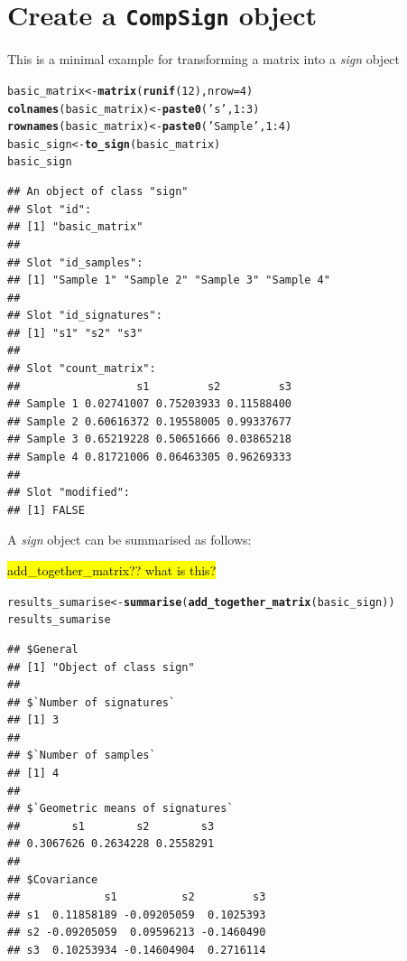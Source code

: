 \documentclass{article}\usepackage[]{graphicx}\usepackage[]{color}
\makeatletter
\newcommand{\hlnum}[1]{\textcolor[rgb]{0.686,0.059,0.569}{#1}}%
\newcommand{\hlstr}[1]{\textcolor[rgb]{0.192,0.494,0.8}{#1}}%
\newcommand{\hlopt}[1]{\textcolor[rgb]{0,0,0}{#1}}%
\newcommand{\hlstd}[1]{\textcolor[rgb]{0.345,0.345,0.345}{#1}}%
\newcommand{\hlkwb}[1]{\textcolor[rgb]{0.69,0.353,0.396}{#1}}%
\newcommand{\hlkwc}[1]{\textcolor[rgb]{0.333,0.667,0.333}{#1}}%
\newcommand{\hlkwd}[1]{\textcolor[rgb]{0.737,0.353,0.396}{\textbf{#1}}}%
\newenvironment{kframe}{%
 \def\at@end@of@kframe{}%
 \ifinner\ifhmode%
  \def\at@end@of@kframe{\end{minipage}}%
  \begin{minipage}{\columnwidth}%
 \fi\fi%
 \def\FrameCommand##1{\hskip\@totalleftmargin \hskip-\fboxsep
 \colorbox{shadecolor}{##1}\hskip-\fboxsep
     \hskip-\linewidth \hskip-\@totalleftmargin \hskip\columnwidth}%
 \MakeFramed {\advance\hsize-\width
   \@totalleftmargin\z@ \linewidth\hsize
   \@setminipage}}%
 {\par\unskip\endMakeFramed%
 \at@end@of@kframe}
\newenvironment{knitrout}{}{} %
\makeatother
\begin{document}
\section{Create a \texttt{CompSign} object}
This is a minimal example for transforming a matrix into a \emph{sign} object
\begin{knitrout}
\color{fgcolor}\begin{kframe}
\begin{alltt}
\hlstd{basic_matrix} \hlkwb{<-} \hlkwd{matrix}\hlstd{(}\hlkwd{runif}\hlstd{(}\hlnum{12}\hlstd{),} \hlkwc{nrow} \hlstd{=} \hlnum{4}\hlstd{)}
\hlkwd{colnames}\hlstd{(basic_matrix)} \hlkwb{<-} \hlkwd{paste0}\hlstd{(}\hlstr{'s'}\hlstd{,} \hlnum{1}\hlopt{:}\hlnum{3}\hlstd{)}
\hlkwd{rownames}\hlstd{(basic_matrix)} \hlkwb{<-} \hlkwd{paste0}\hlstd{(}\hlstr{'Sample '}\hlstd{,} \hlnum{1}\hlopt{:}\hlnum{4}\hlstd{)}
\hlstd{basic_sign} \hlkwb{<-} \hlkwd{to_sign}\hlstd{(basic_matrix)}
\hlstd{basic_sign}
\end{alltt}
\begin{verbatim}
## An object of class "sign"
## Slot "id":
## [1] "basic_matrix"
## 
## Slot "id_samples":
## [1] "Sample 1" "Sample 2" "Sample 3" "Sample 4"
## 
## Slot "id_signatures":
## [1] "s1" "s2" "s3"
## 
## Slot "count_matrix":
##                  s1         s2         s3
## Sample 1 0.02741007 0.75203933 0.11588400
## Sample 2 0.60616372 0.19558005 0.99337677
## Sample 3 0.65219228 0.50651666 0.03865218
## Sample 4 0.81721006 0.06463305 0.96269333
## 
## Slot "modified":
## [1] FALSE
\end{verbatim}
\end{kframe}
\end{knitrout}

A \emph{sign} object can be summarised as follows:

\hl{add\_together\_matrix?? what is this?}

\begin{knitrout}
\color{fgcolor}\begin{kframe}
\begin{alltt}
\hlstd{results_sumarise} \hlkwb{<-} \hlkwd{summarise}\hlstd{(}\hlkwd{add_together_matrix}\hlstd{(basic_sign))}
\hlstd{results_sumarise}
\end{alltt}
\begin{verbatim}
## $General
## [1] "Object of class sign"
## 
## $`Number of signatures`
## [1] 3
## 
## $`Number of samples`
## [1] 4
## 
## $`Geometric means of signatures`
##        s1        s2        s3 
## 0.3067626 0.2634228 0.2558291 
## 
## $Covariance
##             s1          s2         s3
## s1  0.11858189 -0.09205059  0.1025393
## s2 -0.09205059  0.09596213 -0.1460490
## s3  0.10253934 -0.14604904  0.2716114
\end{verbatim}
\end{kframe}
\end{knitrout}
\end{document}
